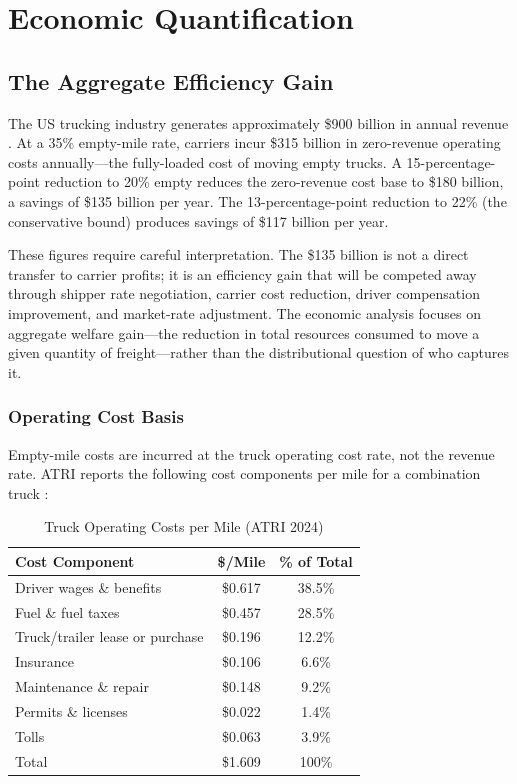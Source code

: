 \section{Economic Quantification}
\label{sec:economic}

\subsection{The Aggregate Efficiency Gain}

The US trucking industry generates approximately \$900 billion in annual revenue \citep{BLS_trucking2023}. At a 35\% empty-mile rate, carriers incur \$315 billion in zero-revenue operating costs annually---the fully-loaded cost of moving empty trucks. A 15-percentage-point reduction to 20\% empty reduces the zero-revenue cost base to \$180 billion, a savings of \$135 billion per year. The 13-percentage-point reduction to 22\% (the conservative bound) produces savings of \$117 billion per year.

These figures require careful interpretation. The \$135 billion is not a direct transfer to carrier profits; it is an efficiency gain that will be competed away through shipper rate negotiation, carrier cost reduction, driver compensation improvement, and market-rate adjustment. The economic analysis focuses on aggregate welfare gain---the reduction in total resources consumed to move a given quantity of freight---rather than the distributional question of who captures it.

\subsubsection{Operating Cost Basis}

Empty-mile costs are incurred at the truck operating cost rate, not the revenue rate. ATRI reports the following cost components per mile for a combination truck \citep{ATRI_costs2024}:

\begin{table}[h]
\centering
\caption{Truck Operating Costs per Mile (ATRI 2024)}
\label{tab:costs}
\begin{tabular}{lcc}
\toprule
Cost Component & \$/Mile & \% of Total \\
\midrule
Driver wages \& benefits & \$0.617 & 38.5\% \\
Fuel \& fuel taxes & \$0.457 & 28.5\% \\
Truck/trailer lease or purchase & \$0.196 & 12.2\% \\
Insurance & \$0.106 & 6.6\% \\
Maintenance \& repair & \$0.148 & 9.2\% \\
Permits \& licenses & \$0.022 & 1.4\% \\
Tolls & \$0.063 & 3.9\% \\
\midrule
Total & \$1.609 & 100\% \\
\bottomrule
\end{tabular}
\end{table}


